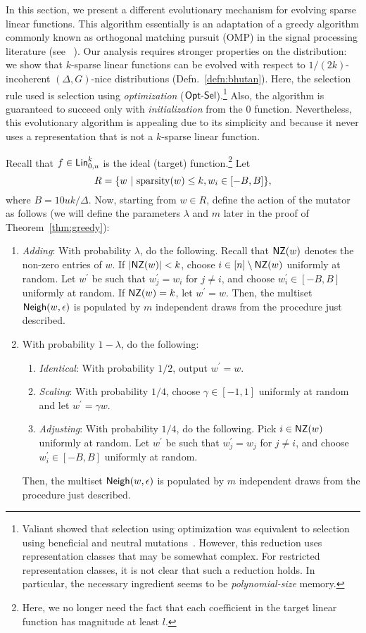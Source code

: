 In this section, we present a different evolutionary mechanism for evolving
sparse linear functions. This algorithm essentially is an adaptation of a greedy
algorithm commonly known as orthogonal matching pursuit (OMP) in the signal
processing literature (see ~\cite{Donoho:2006-recovery, Tropp:2004-greed}). Our
analysis requires stronger properties on the distribution: we show that
$k$-sparse linear functions can be evolved with respect to $1/(2k)$-incoherent
$(\Delta, G)$-nice distributions (Defn.~\ref{defn:bhutan}). Here, the
selection rule used is selection using \emph{optimization}
($\mathsf{Opt\mbox{-}Sel}$).\footnote{Valiant showed that selection using optimization was
equivalent to selection using beneficial and neutral
mutations~\cite{Valiant:2009-evolvability}. However, this reduction uses
representation classes that may be somewhat complex. For restricted
representation classes, it is not clear that such a reduction holds. In
particular, the necessary ingredient seems to be \emph{polynomial-size}
memory.} Also, the algorithm is guaranteed to succeed only with
\emph{initialization} from the $0$ function.  Nevertheless, this evolutionary
algorithm is appealing due to its simplicity and because it never uses a
representation that is not a $k$-sparse linear function.

Recall that $f \in  \mathsf{Lin}^k_{0, u}$ is the ideal (target)
function.\footnote{Here, we no longer need the fact that each coefficient in the
target linear function has magnitude at least $l$.} Let 
%
\[ R = \{w ~|~ \mathrm{sparsity}(w) \leq k, w_i \in [-B, B] \}, \]
%
where $B = 10uk/\Delta$. Now, starting from $w \in R$, define the action of the
mutator as follows (we will define the parameters $\lambda$ and $m$ later in the
proof of Theorem~\ref{thm:greedy}):
\begin{enumerate}
\item {\em Adding}: With probability $\lambda$, do the following. Recall that
$\mathsf{NZ}(w)$ denotes the non-zero entries of $w$. If $|\mathsf{NZ}(w)| < k$, choose $i \in [n]
\setminus \mathsf{NZ}(w)$ uniformly at random. Let $w^\prime$ be such that $w^\prime_j =
w_i$ for $j \neq i$, and choose $w^\prime_i \in [-B, B]$ uniformly at random. If
$\mathsf{NZ}(w)= k$, let $w^\prime = w$. Then, the multiset $\mathsf{Neigh}(w, \epsilon)$ is
populated by $m$ independent draws from the procedure just described.
%
\item With probability $1 - \lambda$, do the following:
%
\begin{enumerate}
\item {\em Identical}: With probability $1/2$, output $w^\prime = w$.
\item {\em Scaling}: With probability $1/4$, choose $\gamma \in [-1, 1]$ uniformly at
random and let $w^\prime = \gamma w$.
%
\item {\em Adjusting}: With probability $1/4$, do the following.  Pick $i \in \mathsf{NZ}(w)$
uniformly at random.  Let $w^\prime$ be such that $w^\prime_j = w_j$ for $j \neq
i$, and choose $w^\prime_i \in [-B, B]$ uniformly at random.
\end{enumerate}
Then, the multiset $\mathsf{Neigh}(w, \epsilon)$ is populated by $m$ independent draws
from the procedure just described.
\end{enumerate}

